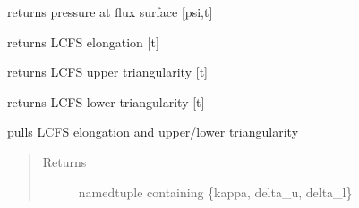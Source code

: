 \documentclass[letterpaper,10pt,english]{sphinxmanual}
\begin{document}
\begin{fulllineitems}

\begin{fulllineitems}
\label{eqtools:eqtools.EFIT.EFITTree.getFluxPres}
returns pressure at flux surface {[}psi,t{]}

\end{fulllineitems}


\begin{fulllineitems}
\label{eqtools:eqtools.EFIT.EFITTree.getElongation}
returns LCFS elongation {[}t{]}

\end{fulllineitems}


\begin{fulllineitems}
\label{eqtools:eqtools.EFIT.EFITTree.getUpperTriangularity}
returns LCFS upper triangularity {[}t{]}

\end{fulllineitems}


\begin{fulllineitems}
\label{eqtools:eqtools.EFIT.EFITTree.getLowerTriangularity}
returns LCFS lower triangularity {[}t{]}

\end{fulllineitems}


\begin{fulllineitems}
\label{eqtools:eqtools.EFIT.EFITTree.getShaping}
pulls LCFS elongation and upper/lower triangularity
\begin{quote}\begin{description}
\item[{Returns}] \leavevmode
namedtuple containing \{kappa, delta\_u, delta\_l\}

\end{description}\end{quote}


\end{fulllineitems}
\end{fulllineitems}
\end{document}
